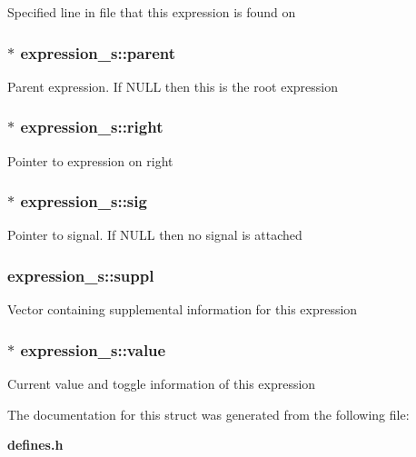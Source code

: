 Specified line in file that this expression is found on 
\subsubsection{$\ast$ expression\_\-s::parent}\label{structexpression__s_m5}


Parent expression. If NULL then this is the root expression 
\subsubsection{$\ast$ expression\_\-s::right}\label{structexpression__s_m6}


Pointer to expression on right 
\subsubsection{$\ast$ expression\_\-s::sig}\label{structexpression__s_m4}


Pointer to signal. If NULL then no signal is attached 
\subsubsection{ expression\_\-s::suppl}\label{structexpression__s_m1}


Vector containing supplemental information for this expression 
\subsubsection{$\ast$ expression\_\-s::value}\label{structexpression__s_m0}


Current value and toggle information of this expression 

The documentation for this struct was generated from the following file:\begin{CompactItemize}
\item 
{\bf defines.h}\end{CompactItemize}
